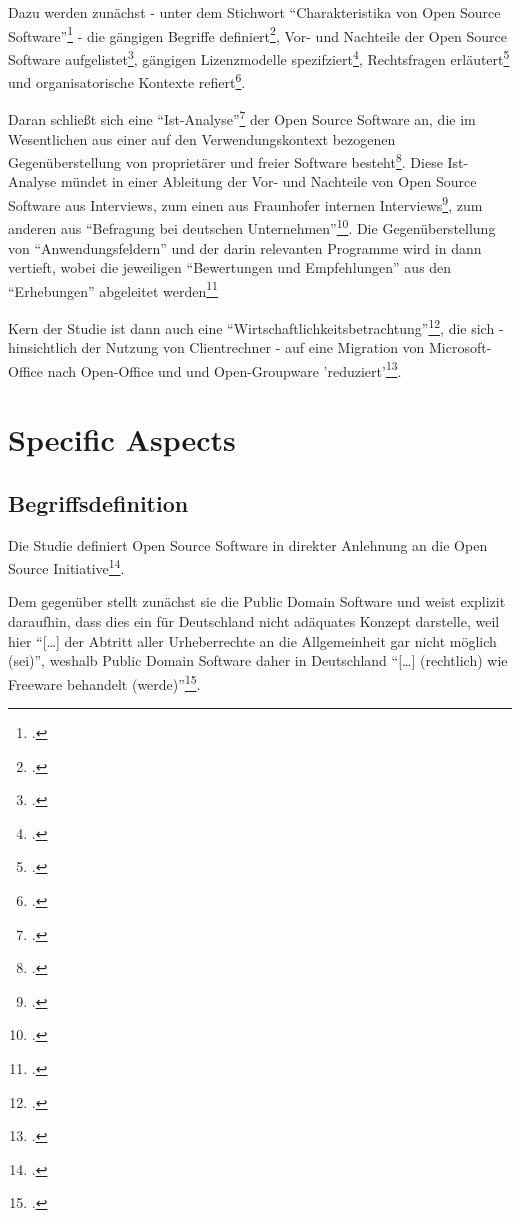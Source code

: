 \documentclass[DIV=calc,BCOR=5mm,11pt,headings=small,oneside,abstract=true, toc=bib]{scrartcl}
\begin{document}
Dazu werden zunächst - unter dem Stichwort \enquote{Charakteristika von
Open Source Software}\footcite[vgl.][12]{RenVetRexKet2005a} - die gängigen
Begriffe definiert\footcite[vgl.][12ff]{RenVetRexKet2005a}, Vor- und Nachteile
der Open Source Software aufgelistet\footcite[vgl.][16ff]{RenVetRexKet2005a},
gängigen Lizenzmodelle spezifziert\footcite[vgl.][19]{RenVetRexKet2005a},
Rechtsfragen erläutert\footcite[vgl.][23]{RenVetRexKet2005a} und
organisatorische Kontexte refiert\footcite[vgl.][29]{RenVetRexKet2005a}.

Daran schließt sich eine
\enquote{Ist-Analyse}\footcite[vgl.][31]{RenVetRexKet2005a} der Open Source
Software an, die im Wesentlichen aus einer auf den Verwendungskontext bezogenen
Gegenüberstellung von proprietärer und freier Software
besteht\footcite[vgl.][36]{RenVetRexKet2005a}. Diese Ist-Analyse mündet in einer
Ableitung der Vor- und Nachteile von Open Source Software aus Interviews, zum
einen aus Fraunhofer internen Interviews\footcite[vgl.][56f]{RenVetRexKet2005a},
zum anderen aus \enquote{Befragung bei deutschen
Unternehmen}\footcite[vgl.][68f]{RenVetRexKet2005a}. Die
Gegenüberstellung von \enquote{Anwendungsfeldern} und der darin relevanten
Programme wird in dann vertieft, wobei die jeweiligen \enquote{Bewertungen
und Empfehlungen} aus den \enquote{Erhebungen} abgeleitet
werden\footcite[vgl. dazu][70ff insbesondere S.82ff]{RenVetRexKet2005a}

Kern der Studie ist dann auch eine
\enquote{Wirtschaftlichkeitsbetrachtung}\footcite[vgl.][154]{RenVetRexKet2005a},
die sich - hinsichtlich der Nutzung von Clientrechner - auf eine Migration von
Microsoft-Office nach Open-Office und und Open-Groupware
'reduziert'\footcite[vgl.][156]{RenVetRexKet2005a}.

\section{Specific Aspects}

\subsection{Begriffsdefinition}

Die Studie definiert Open Source Software in direkter Anlehnung an die Open
Source Initiative\footcite[vgl.][12]{RenVetRexKet2005a}. 

Dem gegenüber stellt zunächst sie die Public Domain Software und weist explizit
daraufhin, dass dies ein für Deutschland nicht adäquates Konzept darstelle, weil
hier \enquote{[\ldots] der Abtritt aller Urheberrechte an die Allgemeinheit gar
nicht möglich (sei)}, weshalb Public Domain Software daher in Deutschland
\enquote{[\ldots] (rechtlich) wie Freeware behandelt
(werde)}\footcite[vgl.][14]{RenVetRexKet2005a}.
\end{document}
